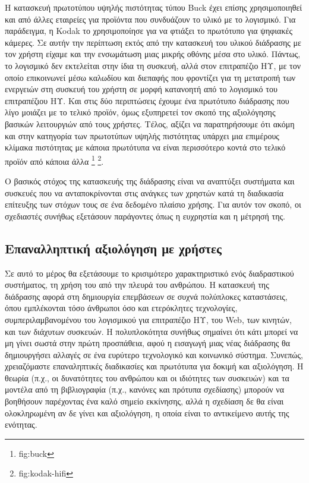 \documentclass[
]{article}
\begin{document}
Η κατασκευή πρωτοτύπου υψηλής πιστότητας τύπου Buck έχει επίσης
χρησιμοποιηθεί και από άλλες εταιρείες για προϊόντα που συνδυάζουν το
υλικό με το λογισμικό. Για παράδειγμα, η Kodak το χρησιμοποίησε για να
φτιάξει το πρωτότυπο για ψηφιακές κάμερες. Σε αυτήν την περίπτωση εκτός
από την κατασκευή του υλικού διάδρασης με τον χρήστη είχαμε και την
ενσωμάτωση μιας μικρής οθόνης μέσα στο υλικό. Πάντως, το λογισμικό δεν
εκτελείται στην ίδια τη συσκευή, αλλά στον επιτραπέζιο ΗΥ, με τον οποίο
επικοινωνεί μέσω καλωδίου και διεπαφής που φροντίζει για τη μετατροπή
των ενεργειών στη συσκευή του χρήστη σε μορφή κατανοητή από το λογισμικό
του επιτραπέζιου ΗΥ. Και στις δύο περιπτώσεις έχουμε ένα πρωτότυπο
διάδρασης που λίγο μοιάζει με το τελικό προϊόν, όμως εξυπηρετεί τον
σκοπό της αξιολόγησης βασικών λειτουργιών από τους χρήστες. Τέλος,
αξίζει να παρατηρήσουμε ότι ακόμη και στην κατηγορία των πρωτοτύπων
υψηλής πιστότητας υπάρχει μια επιμέρους κλίμακα πιστότητας με κάποια
πρωτότυπα να είναι περισσότερο κοντά στο τελικό προϊόν από κάποια άλλα
\footnote{fig:buck} \footnote{fig:kodak-hifi}.

Ο βασικός στόχος της κατασκευής της διάδρασης είναι να αναπτύξει
συστήματα και συσκευές που να ανταποκρίνονται στις ανάγκες των χρηστών
κατά τη διαδικασία επίτευξης των στόχων τους σε ένα δεδομένο πλαίσιο
χρήσης. Για αυτόν τον σκοπό, οι σχεδιαστές συνήθως εξετάσουν παράγοντες
όπως η ευχρηστία και η μέτρησή της.

\hypertarget{ux3b5ux3c0ux3b1ux3bdux3b1ux3bbux3bbux3b7ux3c0ux3c4ux3b9ux3baux3ae-ux3b1ux3beux3b9ux3bfux3bbux3ccux3b3ux3b7ux3c3ux3b7-ux3bcux3b5-ux3c7ux3c1ux3aeux3c3ux3c4ux3b5ux3c2}{%
\subsection{Επαναλληπτική αξιολόγηση με
χρήστες}\label{ux3b5ux3c0ux3b1ux3bdux3b1ux3bbux3bbux3b7ux3c0ux3c4ux3b9ux3baux3ae-ux3b1ux3beux3b9ux3bfux3bbux3ccux3b3ux3b7ux3c3ux3b7-ux3bcux3b5-ux3c7ux3c1ux3aeux3c3ux3c4ux3b5ux3c2}}

Σε αυτό το μέρος θα εξετάσουμε το κρισιμότερο χαρακτηριστικό ενός
διαδραστικού συστήματος, τη χρήση του από την πλευρά του ανθρώπου. Η
κατασκευή της διάδρασης αφορά στη δημιουργία επεμβάσεων σε συχνά
πολύπλοκες καταστάσεις, όπου εμπλέκονται τόσο άνθρωποι όσο και
ετερόκλητες τεχνολογίες, συμπεριλαμβανομένου του λογισμικού για
επιτραπέζιο ΗΥ, του Web, των κινητών, και των διάχυτων συσκευών. Η
πολυπλοκότητα συνήθως σημαίνει ότι κάτι μπορεί να μη γίνει σωστά στην
πρώτη προσπάθεια, αφού η εισαγωγή μιας νέας διάδρασης θα δημιουργήσει
αλλαγές σε ένα ευρύτερο τεχνολογικό και κοινωνικό σύστημα. Συνεπώς,
χρειαζόμαστε επαναληπτικές διαδικασίες και πρωτότυπα για δοκιμή και
αξιολόγηση. Η θεωρία (π.χ., οι δυνατότητες του ανθρώπου και οι ιδιότητες
των συσκευών) και τα μοντέλα από τη βιβλιογραφία (π.χ., κανόνες και
πρότυπα σχεδίασης) μπορούν να βοηθήσουν παρέχοντας ένα καλό σημείο
εκκίνησης, αλλά η σχεδίαση δε θα είναι ολοκληρωμένη αν δε γίνει και
αξιολόγηση, η οποία είναι το αντικείμενο αυτής της ενότητας.
\end{document}
